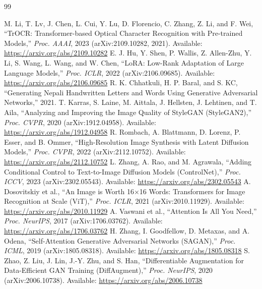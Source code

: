 \documentclass[12pt,a4paper]{report}
\begin{document}
\renewcommand{\bibname}{References}
\begin{thebibliography}{99}

 M. Li, T. Lv, J. Chen, L. Cui, Y. Lu, D. Florencio, C. Zhang, Z. Li, and F. Wei, ``TrOCR: Transformer-based Optical Character Recognition with Pre-trained Models,'' \textit{Proc. AAAI}, 2023 (arXiv:2109.10282, 2021). Available: \url{https://arxiv.org/abs/2109.10282}
 E. J. Hu, Y. Shen, P. Wallis, Z. Allen-Zhu, Y. Li, S. Wang, L. Wang, and W. Chen, ``LoRA: Low-Rank Adaptation of Large Language Models,'' \textit{Proc. ICLR}, 2022 (arXiv:2106.09685). Available: \url{https://arxiv.org/abs/2106.09685}
 R. K. Chhatkuli, H. P. Baral, and S. KC, ``Generating Nepali Handwritten Letters and Words Using Generative Adversarial Networks,'' 2021.
 T. Karras, S. Laine, M. Aittala, J. Hellsten, J. Lehtinen, and T. Aila, ``Analyzing and Improving the Image Quality of StyleGAN (StyleGAN2),'' \textit{Proc. CVPR}, 2020 (arXiv:1912.04958). Available: \url{https://arxiv.org/abs/1912.04958}
 R. Rombach, A. Blattmann, D. Lorenz, P. Esser, and B. Ommer, ``High-Resolution Image Synthesis with Latent Diffusion Models,'' \textit{Proc. CVPR}, 2022 (arXiv:2112.10752). Available: \url{https://arxiv.org/abs/2112.10752}
 L. Zhang, A. Rao, and M. Agrawala, ``Adding Conditional Control to Text-to-Image Diffusion Models (ControlNet),'' \textit{Proc. ICCV}, 2023 (arXiv:2302.05543). Available: \url{https://arxiv.org/abs/2302.05543}
 A. Dosovitskiy et al., ``An Image is Worth 16$\times$16 Words: Transformers for Image Recognition at Scale (ViT),'' \textit{Proc. ICLR}, 2021 (arXiv:2010.11929). Available: \url{https://arxiv.org/abs/2010.11929}
 A. Vaswani et al., ``Attention Is All You Need,'' \textit{Proc. NeurIPS}, 2017 (arXiv:1706.03762). Available: \url{https://arxiv.org/abs/1706.03762}
 H. Zhang, I. Goodfellow, D. Metaxas, and A. Odena, ``Self-Attention Generative Adversarial Networks (SAGAN),'' \textit{Proc. ICML}, 2019 (arXiv:1805.08318). Available: \url{https://arxiv.org/abs/1805.08318}
 S. Zhao, Z. Liu, J. Lin, J.-Y. Zhu, and S. Han, ``Differentiable Augmentation for Data-Efficient GAN Training (DiffAugment),'' \textit{Proc. NeurIPS}, 2020 (arXiv:2006.10738). Available: \url{https://arxiv.org/abs/2006.10738}

\end{thebibliography}
\end{document}
